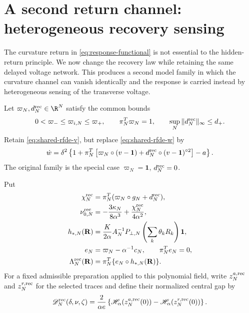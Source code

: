 \section{A second return channel: heterogeneous recovery sensing}
\label{sec:sensed-recovery}

The curvature return in \cref{eq:response-functional} is not essential to
the hidden-return principle.  We now change the recovery law while retaining
the same delayed voltage network.  This produces a second model family in
which the curvature channel can vanish identically and the response is
carried instead by heterogeneous sensing of the transverse voltage.

Let \(\varpi_N,d_N^{\rm rec}\in\R^N\) satisfy the common bounds
\begin{equation}
 0<\varpi_-\le \varpi_{i,N}\le\varpi_+,\qquad
 \pi_N^T\varpi_N=1,\qquad
 \sup_N\|d_N^{\rm rec}\|_\infty\le d_+.              \label{eq:sensing-bounds}
\end{equation}
Retain \cref{eq:shared-rfde-v}, but replace
\cref{eq:shared-rfde-w} by
\begin{equation}
 \dot w=\delta^2\left\{1+
 \pi_N^T\left[\varpi_N\circ(v-\mathbf1)
       +d_N^{\rm rec}\circ(v-\mathbf1)^{\circ2}\right]-a\right\}.
                                                               \label{eq:sensed-recovery-law}
\end{equation}
The original family is the special case
\(\varpi_N=\mathbf1\), \(d_N^{\rm rec}=0\).

Put
\begin{align}
 \chi_N^{\rm rec}
 &=\pi_N^T(\varpi_N\circ g_N+d_N^{\rm rec}),\notag\\
 \nu_{0,N}^{\rm rec}
 &=-\frac{3\kappa_N}{8\alpha^3}
      +\frac{\chi_N^{\rm rec}}{4\alpha^2},           \label{eq:sensing-center}\\
 h_{*,N}(\mathbf R)
 &=\frac{K}{2\alpha}A_N^{-1}P_{\perp,N}
       \left(\sum_k\theta_kR_k\right)\mathbf1,       \label{eq:sensing-transverse-source}\\
 e_N&=\varpi_N-\alpha^{-1}c_N,\qquad \pi_N^Te_N=0,\notag\\
 \Lambda_N^{\rm rec}(\mathbf R)
 &=\pi_N^T\{e_N\circ h_{*,N}(\mathbf R)\}.           \label{eq:sensing-response-functional}
\end{align}
For a fixed admissible preparation applied to this polynomial field, write
\(z_N^{a,{\rm rec}}\) and \(z_N^{r,{\rm rec}}\) for the selected traces and
define their normalized central gap by
\begin{equation}
 \mathscr D_N^{\rm rec}(\delta,\nu,\zeta)
 =\frac{2}{\alpha e}\left\{
   \mathscr H_\alpha(z_N^{a,{\rm rec}}(0))
  -\mathscr H_\alpha(z_N^{r,{\rm rec}}(0))\right\}.  \label{eq:sensing-gap}
\end{equation}

